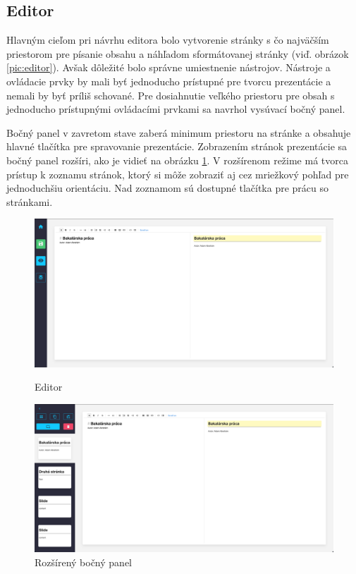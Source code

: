 \subsection*{Editor}
Hlavným cieľom pri návrhu editora bolo vytvorenie stránky s čo najväčším priestorom pre písanie obsahu a náhľadom sformátovanej stránky (viď. obrázok \ref{pic:editor}). Avšak dôležité bolo správne umiestnenie nástrojov. Nástroje a ovládacie prvky by mali byť jednoducho prístupné pre tvorcu prezentácie a nemali by byť príliš schované. Pre dosiahnutie veľkého priestoru pre obsah s jednoducho prístupnými ovládacími prvkami sa navrhol vysúvací bočný panel.

Bočný panel v zavretom stave zaberá minimum priestoru na stránke a obsahuje hlavné tlačítka pre spravovanie prezentácie. Zobrazením stránok prezentácie sa bočný panel rozšíri, ako je vidieť na obrázku \ref{pic:bocny_panel}. V rozšírenom režime má tvorca prístup k zoznamu stránok, ktorý si môže zobraziť aj cez mriežkový pohľad pre jednoduchšiu orientáciu. Nad zoznamom sú dostupné tlačítka pre prácu so stránkami.

\begin{figure}[!hbt]
\centering
\begin{minipage}{.5\textwidth}
  \centering
  \includegraphics[scale=0.11]{obrazky/editor.png}
  \caption{Editor}
  \label{pic:editor}
\end{minipage}%
\begin{minipage}{.5\textwidth}
  \centering
  \includegraphics[scale=0.11]{obrazky/bocny_panel.png}
  \caption{Rozšírený bočný panel}
  \label{pic:bocny_panel}
\end{minipage}
\end{figure}


